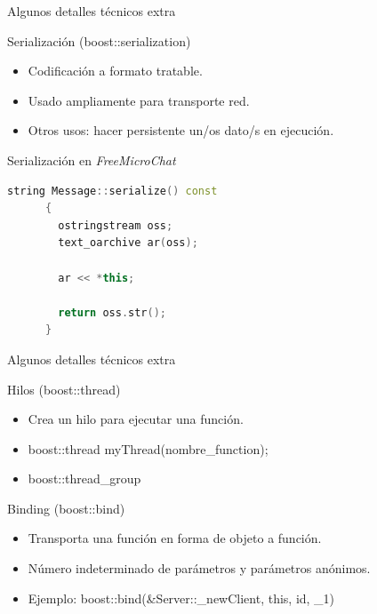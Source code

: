 \documentclass[spanish,xcolor=dvipsnames,svgnames]{beamer}
\newcommand{\freemc}{\textit{FreeMicroChat }}
\begin{document}
\begin{frame}[fragile]{Algunos detalles técnicos extra}
  \begin{block}{Serialización (boost::serialization)}
    \begin{itemize}
    \item Codificación a formato tratable.
    \item Usado ampliamente para transporte red.
    \item Otros usos: hacer persistente un/os dato/s en ejecución.
    \end{itemize}
  \end{block}

  \begin{block}{Serialización en \freemc}
    \begin{lstlisting}[language=C++]
      string Message::serialize() const
      {
        ostringstream oss;
        text_oarchive ar(oss);

        ar << *this;

        return oss.str();
      }
    \end{lstlisting}
  \end{block}
\end{frame}

\begin{frame}{Algunos detalles técnicos extra}
  \begin{block}{Hilos (boost::thread)}
      \begin{itemize}
      \item Crea un hilo para ejecutar una función.
      \item boost::thread myThread(nombre\_function);
      \item boost::thread\_group
      \end{itemize}
  \end{block}

  \begin{block}{Binding (boost::bind)}
    \begin{itemize}
    \item Transporta una función en forma de objeto a función.
    \item Número indeterminado de parámetros y parámetros anónimos.
    \item Ejemplo: boost::bind(\&Server::\_newClient, this, id, \_1)
    \end{itemize}
  \end{block}

\end{frame}
\end{document}
